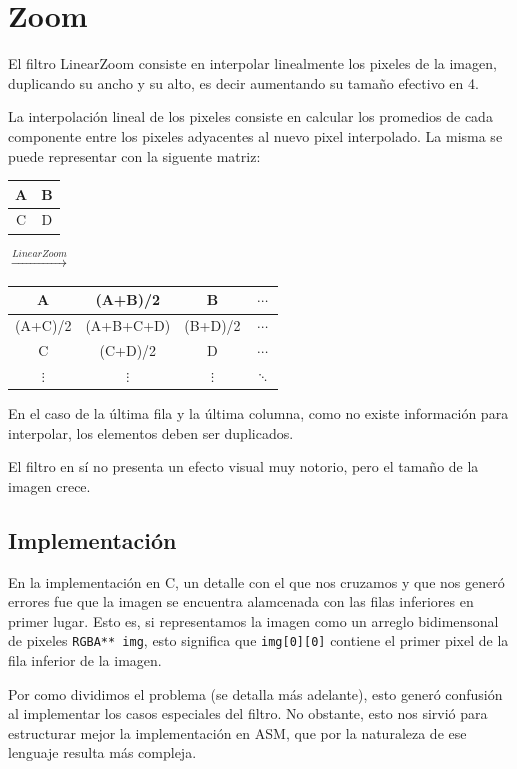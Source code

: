 \section{Zoom}

El filtro LinearZoom consiste en interpolar linealmente los pixeles de la imagen, duplicando su ancho y su alto, es decir aumentando su tamaño efectivo en 4.

La interpolación lineal de los pixeles consiste en calcular los promedios de cada componente entre los pixeles adyacentes al nuevo pixel interpolado. La misma se puede representar con la siguente matriz:

\begin{table}[H]
  \centering
  \begin{tabular}{ | c | c | }
    \hline
    A & B \\ \hline
    C & D \\
    \hline
  \end{tabular}
  {\LARGE$\xrightarrow{LinearZoom}$}
  \begin{tabular}{ | c | c | c | c |}
    \hline
    A & (A+B)/2 & B & $\cdots$ \\ \hline
    (A+C)/2 & (A+B+C+D) & (B+D)/2 & $\cdots$ \\ \hline
    C & (C+D)/2 & D & $\cdots$ \\ \hline
    $\vdots$ & $\vdots$ & $\vdots$ & $\ddots$ \\
    \hline
  \end{tabular}
\end{table}

En el caso de la última fila y la última columna, como no existe información para interpolar, los elementos deben ser duplicados.

El filtro en sí no presenta un efecto visual muy notorio, pero el tamaño de la imagen crece.

\subsection{Implementación}

En la implementación en C, un detalle con el que nos cruzamos y que nos generó errores fue que la imagen se encuentra alamcenada con las filas inferiores en primer lugar. Esto es, si representamos la imagen como un arreglo bidimensonal de pixeles \texttt{RGBA** img}, esto significa que \texttt{img[0][0]} contiene el primer pixel de la fila inferior de la imagen.

Por como dividimos el problema (se detalla más adelante), esto generó confusión al implementar los casos especiales del filtro. No obstante, esto nos sirvió para estructurar mejor la implementación en ASM, que por la naturaleza de ese lenguaje resulta más compleja.

